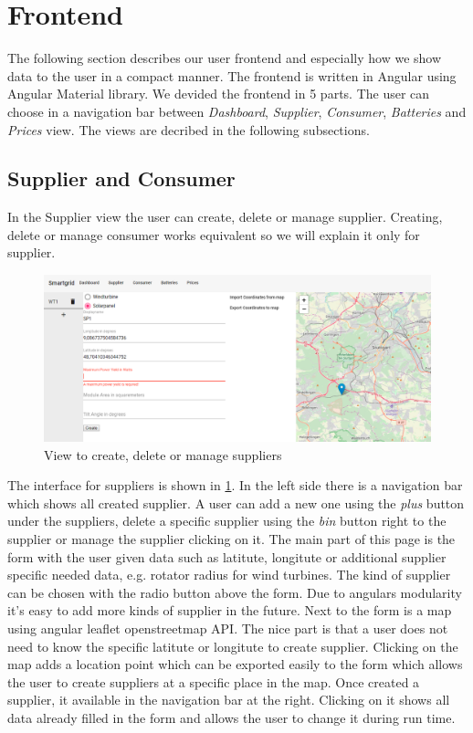 \section{Frontend}\label{sec:frontend}
The following section describes our user frontend and especially how we show data to the user in a compact manner.
The frontend is written in Angular using Angular Material library.
We devided the frontend in 5 parts.
The user can choose in a navigation bar between \textit{Dashboard}, \textit{Supplier}, \textit{Consumer}, \textit{Batteries} and \textit{Prices} view.
The views are decribed in the following subsections.

\subsection{Supplier and Consumer}
In the Supplier view the user can create, delete or manage supplier.
Creating, delete or manage consumer works equivalent so we will explain it only for supplier.

\begin{figure}[!h]
    \centering
    \includegraphics[width=1.00\textwidth]{../figures/supplierView.PNG}
    \caption{View to create, delete or manage suppliers}
    \label{fig:suppliers}
\end{figure}

The interface for suppliers is shown in \cref{fig:suppliers}.
In the left side there is a navigation bar which shows all created supplier.
A user can add a new one using the \textit{plus} button under the suppliers, delete a specific supplier using the \textit{bin} button right to the supplier or manage the supplier clicking on it.
The main part of this page is the form with the user given data such as latitute, longitute or additional supplier specific needed data, e.g. rotator radius for wind turbines.
The kind of supplier can be chosen with the radio button above the form.
Due to angulars modularity it's easy to add more kinds of supplier in the future.
Next to the form is a map using angular leaflet openstreetmap API.
The nice part is that a user does not need to know the specific latitute or longitute to create supplier.
Clicking on the map adds a location point which can be exported easily to the form which allows the user to create suppliers at a specific place in the map.
Once created a supplier, it available in the navigation bar at the right.
Clicking on it shows all data already filled in the form and allows the user to change it during run time.



